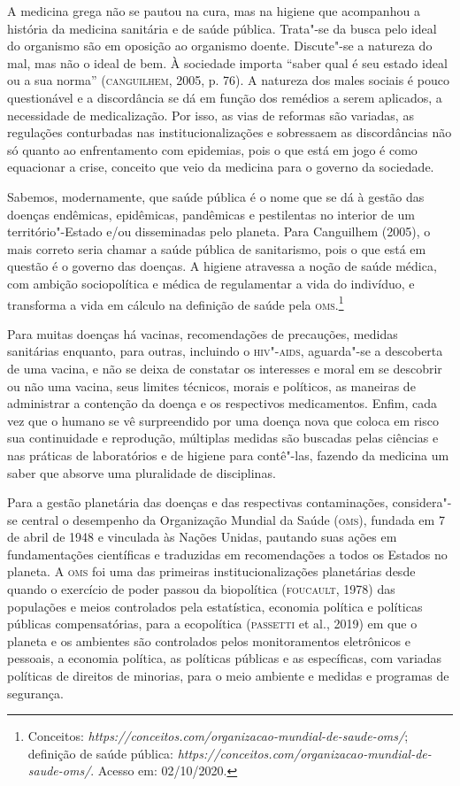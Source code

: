A medicina grega não se pautou na cura, mas na higiene que acompanhou a
história da medicina sanitária e de saúde pública. Trata"-se da busca
pelo ideal do organismo são em oposição ao organismo doente. Discute"-se
a natureza do mal, mas não o ideal de bem. À sociedade importa ``saber
qual é seu estado ideal ou a sua norma'' (\textsc{canguilhem}, 2005, p. 76). A
natureza dos males sociais é pouco questionável e a discordância se dá
em função dos remédios a serem aplicados, a necessidade de
medicalização. Por isso, as vias de reformas são variadas, as regulações
conturbadas nas institucionalizações e sobressaem as discordâncias não
só quanto ao enfrentamento com epidemias, pois o que está em jogo é como
equacionar a crise, conceito que veio da medicina para o governo da
sociedade.

Sabemos, modernamente, que saúde pública é o nome que se dá à gestão das
doenças endêmicas, epidêmicas, pandêmicas e pestilentas no interior de
um território"-Estado e/ou disseminadas pelo planeta. Para Canguilhem
(2005), o mais correto seria chamar a saúde pública de sanitarismo, pois
o que está em questão é o governo das doenças. A higiene atravessa a
noção de saúde médica, com ambição sociopolítica e médica de
regulamentar a vida do indivíduo, e transforma a vida em cálculo na
definição de saúde pela \textsc{oms}.\footnote{Conceitos:
  \emph{https://conceitos.com/organizacao-mundial-de-saude-oms/};
  definição de saúde pública:
  \emph{https://conceitos.com/organizacao-mundial-de-saude-oms/}. Acesso
  em: 02/10/2020.}

Para muitas doenças há vacinas, recomendações de precauções, medidas
sanitárias enquanto, para outras, incluindo o \textsc{hiv}"-\textsc{aids}, aguarda"-se a
descoberta de uma vacina, e não se deixa de constatar os interesses e
moral em se descobrir ou não uma vacina, seus limites técnicos, morais e
políticos, as maneiras de administrar a contenção da doença e os
respectivos medicamentos. Enfim, cada vez que o humano se vê
surpreendido por uma doença nova que coloca em risco sua continuidade e
reprodução, múltiplas medidas são buscadas pelas ciências e nas práticas
de laboratórios e de higiene para contê"-las, fazendo da medicina um
saber que absorve uma pluralidade de disciplinas.

Para a gestão planetária das doenças e das respectivas contaminações,
considera"-se central o desempenho da Organização Mundial da Saúde (\textsc{oms}),
fundada em 7 de abril de 1948 e vinculada às Nações Unidas, pautando
suas ações em fundamentações científicas e traduzidas em recomendações a
todos os Estados no planeta. A \textsc{oms} foi uma das primeiras
institucionalizações planetárias desde quando o exercício de poder
passou da biopolítica (\textsc{foucault}, 1978) das populações e meios
controlados pela estatística, economia política e políticas públicas
compensatórias, para a ecopolítica (\textsc{passetti} et al., 2019) em que o
planeta e os ambientes são controlados pelos monitoramentos eletrônicos
e pessoais, a economia política, as políticas públicas e as específicas,
com variadas políticas de direitos de minorias, para o meio ambiente e
medidas e programas de segurança.

